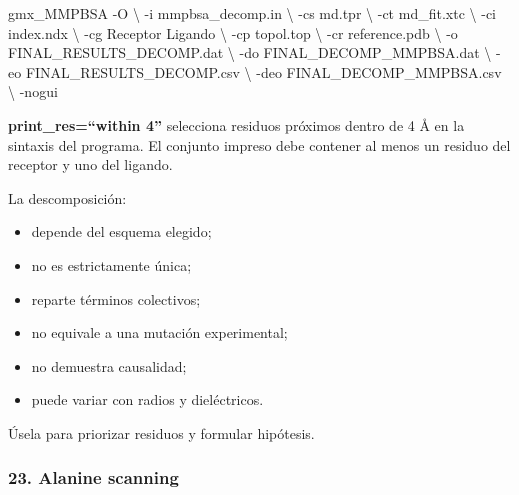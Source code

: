 \documentclass[
  spanish,
  11pt,
  a4paper]{article}
\newenvironment{Shaded}{\begin{snugshade}}{\end{snugshade}}
\newcommand{\AttributeTok}[1]{\textcolor[rgb]{0.13,0.29,0.53}{#1}}
\newcommand{\DataTypeTok}[1]{\textcolor[rgb]{0.13,0.29,0.53}{#1}}
\newcommand{\ExtensionTok}[1]{#1}
\newcommand{\NormalTok}[1]{#1}
\providecommand{\tightlist}{%
  \setlength{\itemsep}{0pt}\setlength{\parskip}{0pt}}
\begin{document}
\begin{Shaded}
\begin{Highlighting}[]
\ExtensionTok{gmx\_MMPBSA} \AttributeTok{{-}O} \DataTypeTok{\textbackslash{}}
    \AttributeTok{{-}i}\NormalTok{ mmpbsa\_decomp.in }\DataTypeTok{\textbackslash{}}
    \AttributeTok{{-}cs}\NormalTok{ md.tpr }\DataTypeTok{\textbackslash{}}
    \AttributeTok{{-}ct}\NormalTok{ md\_fit.xtc }\DataTypeTok{\textbackslash{}}
    \AttributeTok{{-}ci}\NormalTok{ index.ndx }\DataTypeTok{\textbackslash{}}
    \AttributeTok{{-}cg}\NormalTok{ Receptor Ligando }\DataTypeTok{\textbackslash{}}
    \AttributeTok{{-}cp}\NormalTok{ topol.top }\DataTypeTok{\textbackslash{}}
    \AttributeTok{{-}cr}\NormalTok{ reference.pdb }\DataTypeTok{\textbackslash{}}
    \AttributeTok{{-}o}\NormalTok{ FINAL\_RESULTS\_DECOMP.dat }\DataTypeTok{\textbackslash{}}
    \AttributeTok{{-}do}\NormalTok{ FINAL\_DECOMP\_MMPBSA.dat }\DataTypeTok{\textbackslash{}}
    \AttributeTok{{-}eo}\NormalTok{ FINAL\_RESULTS\_DECOMP.csv }\DataTypeTok{\textbackslash{}}
    \AttributeTok{{-}deo}\NormalTok{ FINAL\_DECOMP\_MMPBSA.csv }\DataTypeTok{\textbackslash{}}
    \AttributeTok{{-}nogui}
\end{Highlighting}
\end{Shaded}

\textbf{print\_res=``within 4''} selecciona residuos próximos dentro de
4 Å en la sintaxis del programa. El conjunto impreso debe contener al
menos un residuo del receptor y uno del ligando.

La descomposición:

\begin{itemize}
\tightlist
\item
  depende del esquema elegido;
\item
  no es estrictamente única;
\item
  reparte términos colectivos;
\item
  no equivale a una mutación experimental;
\item
  no demuestra causalidad;
\item
  puede variar con radios y dieléctricos.
\end{itemize}

Úsela para priorizar residuos y formular hipótesis.

\subsubsection{23. Alanine scanning}\label{alanine-scanning}
\end{document}
